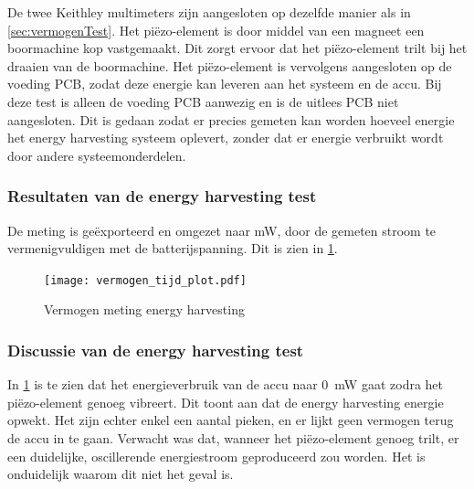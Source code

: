 De twee Keithley multimeters zijn aangesloten op dezelfde manier als in \cref{sec:vermogenTest}. Het piëzo-element is door middel van een magneet een boormachine kop vastgemaakt. Dit zorgt ervoor dat het piëzo-element trilt bij het draaien van de boormachine. Het piëzo-element is vervolgens aangesloten op de voeding PCB, zodat deze energie kan leveren aan het systeem en de accu. Bij deze test is alleen de voeding PCB aanwezig en is de uitlees PCB niet aangesloten. Dit is gedaan zodat er precies gemeten kan worden hoeveel energie het energy harvesting systeem oplevert, zonder dat er energie verbruikt wordt door andere systeemonderdelen.

\subsubsection{Resultaten van de energy harvesting test}
De meting is geëxporteerd en omgezet naar mW, door de gemeten stroom te vermenigvuldigen met de batterijspanning. Dit is zien in \cref{fig:vermogenPlot}.

\begin{figure}[!htbp]
    \centering
    \texttt{[image: vermogen\_tijd\_plot.pdf]}
    \caption{Vermogen meting energy harvesting}
    \label{fig:vermogenPlot}
\end{figure}

\subsubsection{Discussie van de energy harvesting test}
In \cref{fig:vermogenPlot} is te zien dat het energieverbruik van de accu naar \qty{0}{\milli\watt} gaat zodra het piëzo-element genoeg vibreert. Dit toont aan dat de energy harvesting energie opwekt. Het zijn echter enkel een aantal pieken, en er lijkt geen vermogen terug de accu in te gaan. Verwacht was dat, wanneer het piëzo-element genoeg trilt, er een duidelijke, oscillerende energiestroom geproduceerd zou worden. Het is onduidelijk waarom dit niet het geval is.